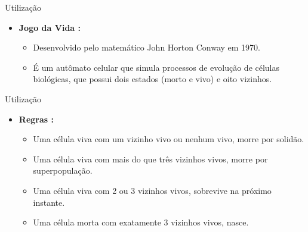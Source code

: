 \documentclass[compress, hide notes]{beamer}
\begin{document}
\begin{frame}{Utilização}
	
	\begin{itemize}
	
		\item \textbf{Jogo da Vida \cite{ufmg}:}
		
		\begin{itemize}
		
			\item Desenvolvido pelo matemático John Horton Conway em 1970.
			
			\bigskip
			
			\item É um autômato celular que simula processos de evolução de células biológicas, que possui dois estados (morto e vivo) e oito vizinhos.
		
		\end{itemize}
		
	\end{itemize}
	
\end{frame}

\begin{frame}{Utilização}
	
	\begin{itemize}
	
		\item \textbf{Regras \cite{ufmg}:}
		
		\begin{itemize}
			
			\item Uma célula viva com um vizinho vivo ou nenhum vivo, morre por solidão.
			
			\bigskip
			
			\item Uma célula viva com mais do que três vizinhos vivos, morre por superpopulação.
			
			\bigskip
			
			\item Uma célula viva com 2 ou 3 vizinhos vivos, sobrevive na próximo instante.
			
			\bigskip
			
			\item Uma célula morta com exatamente 3 vizinhos vivos, nasce.
		
		\end{itemize}
		
	\end{itemize}
	
\end{frame}
\end{document}
